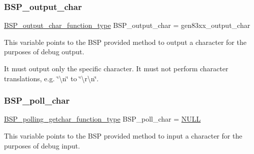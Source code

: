 \subsubsection{\texorpdfstring{BSP\_output\_char}{BSP\_output\_char}}
{\footnotesize\ttfamily \mbox{\hyperlink{bspIo_8h_a0b0dff1c3d35110ae303b4098c60dc14}{B\+S\+P\+\_\+output\+\_\+char\+\_\+function\+\_\+type}} B\+S\+P\+\_\+output\+\_\+char = gen83xx\+\_\+output\+\_\+char}

This variable points to the B\+SP provided method to output a character for the purposes of debug output.

It must output only the specific character. It must not perform character translations, e.\+g. \char`\"{}\textbackslash{}n\char`\"{} to \char`\"{}\textbackslash{}r\textbackslash{}n\char`\"{}. \mbox{\label{powerpc_2gen83xx_2console_2console-config_8c_ae5846eecdfa8f2813504371bf01c29b0}} 
\subsubsection{\texorpdfstring{BSP\_poll\_char}{BSP\_poll\_char}}
{\footnotesize\ttfamily \mbox{\hyperlink{bspIo_8h_a132b9ceff428a634ece5dfaac7ef1006}{B\+S\+P\+\_\+polling\+\_\+getchar\+\_\+function\+\_\+type}} B\+S\+P\+\_\+poll\+\_\+char = \mbox{\hyperlink{bestcomm__api_8h_a872bb74de61c3689ccd5b41873fce42c}{N\+U\+LL}}}

This variable points to the B\+SP provided method to input a character for the purposes of debug input. 